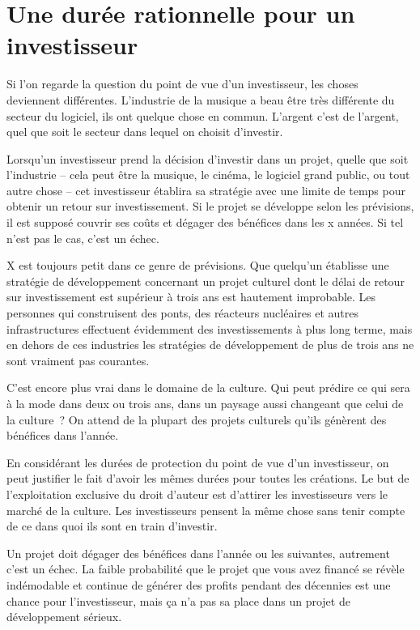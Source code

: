 \section{Une durée rationnelle pour un investisseur}

Si l'on regarde la question du point de vue d’un investisseur, les choses deviennent
différentes. L’industrie de la musique a beau être très différente du secteur du logiciel, ils ont
quelque chose en commun. L’argent c’est de l’argent, quel que soit le secteur dans lequel on choisit d’investir.

Lorsqu’un investisseur prend la décision d’investir dans un projet, quelle que soit l’industrie – cela
peut être la musique, le cinéma, le logiciel grand public, ou tout autre chose – cet investisseur
établira sa stratégie avec une limite de temps pour obtenir un retour sur investissement. Si le
projet se développe selon les prévisions, il est supposé couvrir ses coûts et dégager des bénéfices
dans les x années. Si tel n’est pas le cas, c’est un échec.

X est toujours petit dans ce genre de prévisions. Que quelqu’un établisse une stratégie de
développement concernant un projet culturel dont le délai de retour sur investissement est supérieur
à trois ans est hautement improbable. Les personnes qui construisent des ponts, des réacteurs
nucléaires et autres infrastructures effectuent évidemment des investissements à plus long terme,
mais en dehors de ces industries les stratégies de développement de plus de trois ans ne sont
vraiment pas courantes.

C’est encore plus vrai dans le domaine de la culture. Qui peut prédire ce qui sera à la mode dans
deux ou trois ans, dans un paysage aussi changeant que celui de la culture~? On attend de la plupart
des projets culturels qu’ils génèrent des bénéfices dans l’année.

En considérant les durées de protection du point de vue d’un investisseur, on peut justifier le
fait d’avoir les mêmes durées pour toutes les créations. Le but de l’exploitation exclusive du droit
d’auteur est d’attirer les investisseurs vers le marché de la culture. Les investisseurs pensent
la même chose sans tenir compte de ce dans quoi ils sont en train d’investir.

Un projet doit dégager des bénéfices dans l’année ou les suivantes, autrement
c’est un échec. La faible probabilité que le projet que vous avez financé se révèle indémodable et
continue de générer des profits pendant des décennies est une chance pour l’investisseur, mais ça
n’a pas sa place dans un projet de développement sérieux.

